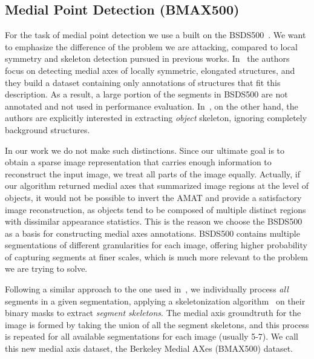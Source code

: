 \documentclass[10pt,twocolumn,letterpaper]{article}
\begin{document}
\subsection{Medial Point Detection (BMAX500)}\label{sec:experiments:detection}
For the task of medial point detection we use a built on the BSDS500~\cite{martin2001database,arbelaez2011contour}.
We want to emphasize the difference of the problem we are attacking, compared to local symmetry
and skeleton detection pursued in previous works.
In~\cite{tsogkas2012learning} the authors focus on detecting medial axes of locally symmetric, elongated structures,
and they build a dataset containing only annotations of structures that fit this description.
As a result, a large portion of the segments in BSDS500 are not annotated and not used in performance evaluation.
In~\cite{shen2016object}, on the other hand, the authors are explicitly interested in extracting \emph{object}
skeleton, ignoring completely background structures.

In our work we do not make such distinctions. Since our ultimate goal is to obtain a sparse image representation
that carries enough information to reconstruct the input image, we treat all parts of the image equally.
Actually, if our algorithm returned medial axes that summarized image regions at the level of objects, 
it would not be possible to invert the AMAT and provide a satisfactory image reconstruction, as objects tend to
be composed of multiple distinct regions with dissimilar appearance statistics.
This is the reason we choose the BSDS500 as a basis for constructing medial axes annotations.
BSDS500 contains multiple segmentations of different granularities for each image, offering higher probability of
capturing segments at finer scales, which is much more relevant to the problem we are trying to solve.

Following a similar approach to the one used in~\cite{tsogkas2012learning,shen2016object}, 
we individually process \emph{all} segments in a given segmentation, applying a skeletonization 
algorithm~\cite{telea2002augmented} on their binary masks to extract \emph{segment skeletons}.
The medial axis groundtruth for the image is formed by taking the union of all the segment skeletons, and this
process is repeated for all available segmentations for each image (usually 5-7).
We call this new medial axis dataset, the Berkeley Medial AXes (BMAX500) dataset.
\end{document}
